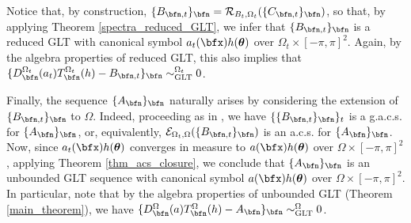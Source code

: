 \documentclass{amsart}
\newcommand{\bftheta}{{\boldsymbol\theta}}
\begin{document}
Notice that, by construction, $\{B_{\bfn,t}\}_{\bfn} = \mathcal{R}_{B_t, \Omega_t}(\{C_{\bfn,t}\}_{\bfn})$, so that, by applying Theorem \ref{spectra_reduced_GLT}, we infer that $\{B_{\bfn,t}\}_{\bfn}$ is a reduced GLT with canonical symbol $a_t(\bfx)h(\bftheta)$ over $\Omega_t \times [-\pi,\pi]^2$. Again, by the algebra properties of reduced GLT, this also implies that $\{D_{\bfn}^{\Omega_t}(a_t) T_{\bfn}^{\Omega_t}(h)-B_{\bfn,t}\}_{\bfn} \sim_{\mathrm{GLT}}^{\Omega_t} 0$. 

Finally, the sequence $\{A_{\bfn}\}_{\bfn}$ naturally arises by considering the extension of $\{B_{\bfn,t}\}_{\bfn}$ to $\Omega$. Indeed, proceeding as in \cite[Section 4.1]{gacs}, we have $\{\{B_{\bfn,t}\}_{\bfn}\}_t$ is a g.a.c.s. for $\{A_{\bfn}\}_{\bfn}$, or, equivalently, $\mathcal{E}_{\Omega_t,\Omega}(\{B_{\bfn,t}\}_{\bfn})$ is an a.c.s. for $\{A_{\bfn}\}_{\bfn}$. Now, since $a_t(\bfx)h(\bftheta)$ converges in measure to $a(\bfx)h(\bftheta)$ over $\Omega \times [-\pi,\pi]^2$, applying Theorem \ref{thm_acs_closure}, we conclude that $\{A_{\bfn}\}_{\bfn}$ is an unbounded GLT sequence with canonical symbol $a(\bfx)h(\bftheta)$ over $\Omega \times [-\pi,\pi]^2$. In particular, note that by the algebra properties of unbounded GLT (Theorem \ref{main_theorem}), we have $\{D_{\bfn}^{\Omega}(a)T_{\bfn}^{\Omega}(h)-A_{\bfn}\}_{\bfn} \sim_{\mathrm{GLT}}^{\Omega} 0$.



\end{document}
